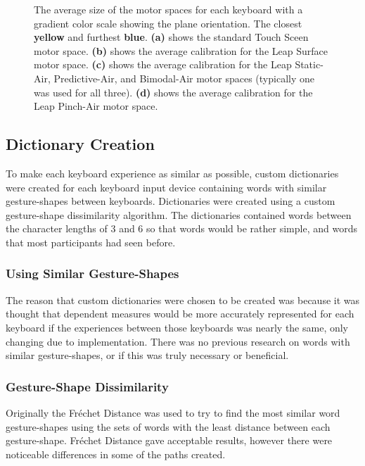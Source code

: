 \begin{figure}[h]
\begin{minipage}[t]{2.5in}
		\label{fig_calibration_pinch}
	\end{minipage}
	\caption[Motor Space Comparison]{The average size of the motor spaces for each keyboard with a gradient color scale showing the plane orientation. The closest \textbf{yellow} and furthest \textbf{blue}. \textbf{(a)} shows the standard Touch Sceen motor space. \textbf{(b)} shows the average calibration for the Leap Surface motor space. \textbf{(c)} shows the average calibration for the Leap Static-Air, Predictive-Air, and Bimodal-Air motor spaces (typically one was used for all three). \textbf{(d)} shows the average calibration for the Leap Pinch-Air motor space.}
	\label{motor_space_size}
\end{figure}

\subsection{Dictionary Creation} \label{dictionary_creation}
To make each keyboard experience as similar as possible, custom dictionaries were created for each keyboard input device containing words with similar gesture-shapes between keyboards. Dictionaries were created using a custom gesture-shape dissimilarity algorithm. The dictionaries contained words between the character lengths of 3 and 6 so that words would be rather simple, and words that most participants had seen before.

\subsubsection{Using Similar Gesture-Shapes}
The reason that custom dictionaries were chosen to be created was because it was thought that dependent measures would be more accurately represented for each keyboard if the experiences between those keyboards was nearly the same, only changing due to implementation. There was no previous research on words with similar gesture-shapes, or if this was truly necessary or beneficial.

\subsubsection {Gesture-Shape Dissimilarity}
Originally the Fr\'echet Distance was used to try to find the most similar word gesture-shapes using the sets of words with the least distance between each gesture-shape. Fr\'echet Distance gave acceptable results, however there were noticeable differences in some of the paths created.

